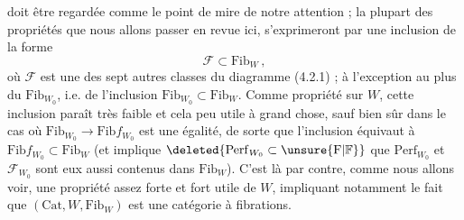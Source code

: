 doit être regardée comme le point de mire de
notre attention ; la plupart des propriétés  que
nous allons passer en revue ici, s'exprimeront par  une inclusion de la forme
\[
\mathcal F\subset\mathrm{Fib}_W\,,
\]
où $\mathcal F$ est une des sept autres classes du
diagramme (4.2.1) ; à l'exception 
au plus du  $\mathrm{Fib}_{W_0}$, i.e. de l'inclusion
$\mathrm{Fib}_{W_0}\subset\mathrm{Fib}_W$. Comme propriété sur $W$, cette
inclusion paraît très faible et  cela peu
utile à grand chose, sauf bien sûr dans
le cas où $\mathrm{Fib}_{W_0}\longrightarrow\mathrm{Fib}f_{W_0}$ est une égalité,
de  sorte que l'inclusion 
équivaut à $\mathrm{Fib}f_{W_0}\subset\mathrm{Fib}_W$ (et implique
$\deleted{\mathrm{Perf}_{W_0}\subset\unsure{\mathrm F|\mathbb F}}$ que $\mathrm{Perf}_{W_0}$ et $\mathcal F_{W_0}$ sont eux aussi
contenus dans $\mathrm{Fib}_W$). C'est là par contre,
comme nous allons voir, une propriété assez
forte et fort utile de $W$, impliquant notamment le fait que $(\mathrm{Cat},W,\mathrm{Fib}_W)$ est une
catégorie à fibrations.
